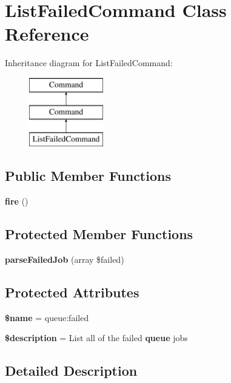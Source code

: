 \section{List\+Failed\+Command Class Reference}
\label{class_illuminate_1_1_queue_1_1_console_1_1_list_failed_command}
Inheritance diagram for List\+Failed\+Command\+:\begin{figure}[H]
\begin{center}
\leavevmode
\includegraphics[height=3.000000cm]{class_illuminate_1_1_queue_1_1_console_1_1_list_failed_command}
\end{center}
\end{figure}
\subsection*{Public Member Functions}
\begin{DoxyCompactItemize}
\item 
{\bf fire} ()
\end{DoxyCompactItemize}
\subsection*{Protected Member Functions}
\begin{DoxyCompactItemize}
\item 
{\bf parse\+Failed\+Job} (array \$failed)
\end{DoxyCompactItemize}
\subsection*{Protected Attributes}
\begin{DoxyCompactItemize}
\item 
{\bf \$name} = \textquotesingle{}queue\+:failed\textquotesingle{}
\item 
{\bf \$description} = \textquotesingle{}List all of the failed {\bf queue} jobs\textquotesingle{}
\end{DoxyCompactItemize}


\subsection{Detailed Description}


